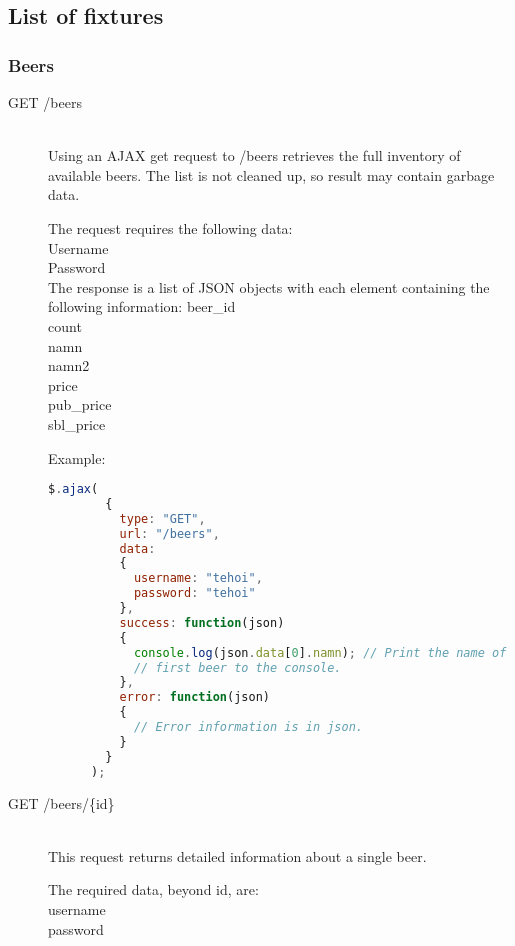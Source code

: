\documentclass[a4paper]{article}
\begin{document}
\subsection{List of fixtures}
\subsubsection{Beers}
\begin{description}
  \item[GET /beers]\hfill\\
    Using an AJAX get request to /beers retrieves the full inventory of available beers. The list is not cleaned up, so result may contain garbage data.\hfill

    The request requires the following data: \hfill \\
    Username\hfill \\
    Password\hfill \\
    
    The response is a list of JSON objects with each element containing the following information:
    beer\_id\hfill\\
    count\hfill\\
    namn\hfill\\
    namn2\hfill\\
    price\hfill\\
    pub\_price\hfill\\
    sbl\_price\hfill

    Example:\hfill\\
    \begin{lstlisting}[language=javascript, frame=single, showstringspaces = false, basicstyle=\small\ttfamily]
$.ajax(
        {
          type: "GET",
          url: "/beers",
          data:
          {
            username: "tehoi",
            password: "tehoi"
          },
          success: function(json)
          {
            console.log(json.data[0].namn); // Print the name of the 
            // first beer to the console.
          },
          error: function(json)
          {
            // Error information is in json.
          }
        }
      );
    \end{lstlisting}
  \item[GET /beers/\{id\}]\hfill\\
    This request returns detailed information about a single beer.

    The required data, beyond id, are:\hfill\\
    username\hfill\\
    password\hfill\\


\end{description}
\end{document}
